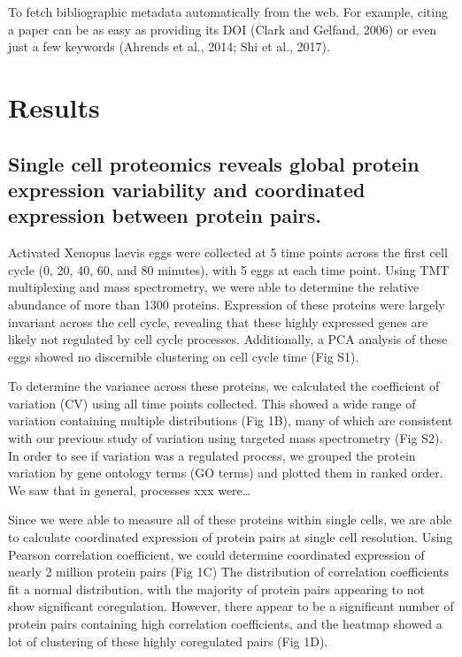\documentclass[11pt,]{article}
\begin{document}
To fetch bibliographic metadata automatically from the web. For example,
citing a paper can be as easy as providing its DOI (Clark and Gelfand,
2006) or even just a few keywords (Ahrends et al., 2014; Shi et al.,
2017).

\hypertarget{results}{%
\section{Results}\label{results}}

\hypertarget{single-cell-proteomics-reveals-global-protein-expression-variability-and-coordinated-expression-between-protein-pairs.}{%
\subsection{Single cell proteomics reveals global protein expression
variability and coordinated expression between protein
pairs.}\label{single-cell-proteomics-reveals-global-protein-expression-variability-and-coordinated-expression-between-protein-pairs.}}

Activated Xenopus laevis eggs were collected at 5 time points across the
first cell cycle (0, 20, 40, 60, and 80 minutes), with 5 eggs at each
time point. Using TMT multiplexing and mass spectrometry, we were able
to determine the relative abundance of more than 1300 proteins.
Expression of these proteins were largely invariant across the cell
cycle, revealing that these highly expressed genes are likely not
regulated by cell cycle processes. Additionally, a PCA analysis of these
eggs showed no discernible clustering on cell cycle time (Fig S1).

To determine the variance across these proteins, we calculated the
coefficient of variation (CV) using all time points collected. This
showed a wide range of variation containing multiple distributions (Fig
1B), many of which are consistent with our previous study of variation
using targeted mass spectrometry (Fig S2). In order to see if variation
was a regulated process, we grouped the protein variation by gene
ontology terms (GO terms) and plotted them in ranked order. We saw that
in general, processes xxx were\ldots{}

Since we were able to measure all of these proteins within single cells,
we are able to calculate coordinated expression of protein pairs at
single cell resolution. Using Pearson correlation coefficient, we could
determine coordinated expression of nearly 2 million protein pairs (Fig
1C) The distribution of correlation coefficients fit a normal
distribution, with the majority of protein pairs appearing to not show
significant coregulation. However, there appear to be a significant
number of protein pairs containing high correlation coefficients, and
the heatmap showed a lot of clustering of these highly coregulated pairs
(Fig 1D).
\end{document}
